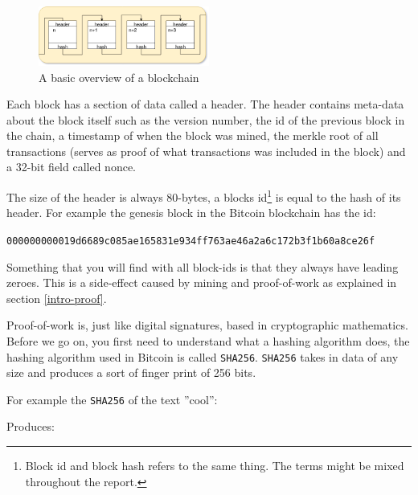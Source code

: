 \begin{figure}[H]
	\centering
	\includegraphics[width=0.5\textwidth]{introduction/images/blockchain.png}
	\caption{A basic overview of a blockchain}
	\label{fig:blockchain}
\end{figure}

Each block has a section of data called a header. The header contains meta-data 
about the block itself such as the version number, the id of the previous block 
in the chain, a timestamp of when the block was mined, the merkle root of 
all transactions (serves as proof of what transactions was included in the block) 
and a 32-bit field called nonce. 

The size of the header is always 80-bytes, a blocks id\footnote{Block id and 
block hash refers to the same thing. The terms might be mixed throughout the report.} 
is equal to the hash of its header. For example the genesis block in the 
Bitcoin blockchain has the id:

\texttt{000000000019d6689c085ae165831e934ff763ae46a2a6c172b3f1b60a8ce26f}

Something that you will find with all block-ids is that they always have leading zeroes. 
This is a side-effect  caused by mining and proof-of-work as explained in section \ref{intro-proof}.

\label{intro-proof}
Proof-of-work is, just like digital signatures, based in cryptographic
mathematics. Before we go on, you first need to understand what a hashing
algorithm does, the hashing algorithm used in Bitcoin is called \texttt{SHA256}.
\texttt{SHA256} takes in data of any size and produces a sort of finger print
of 256 bits.

For example the \texttt{SHA256} of the text ''cool'':


Produces:


